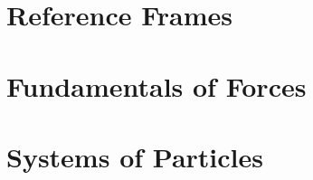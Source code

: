 \documentclass[british,11pt,a4paper]{report}
\begin{document}
\maketitle
\tableofcontents
\chapter{Reference Frames}
\label{chapRefFrames}

\chapter{Fundamentals of Forces}
\label{chapForces}

\chapter{Systems of Particles}
\label{chapSystems}

\end{document}
